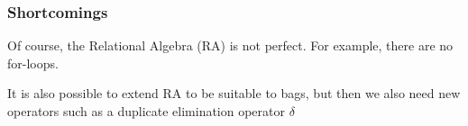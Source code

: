 \subsubsection{Shortcomings}
Of course, the Relational Algebra (RA) is not perfect. For example, there are no for-loops.

It is also possible to extend RA to be suitable to bags, but then we also need new operators such as a duplicate elimination operator $\delta$
